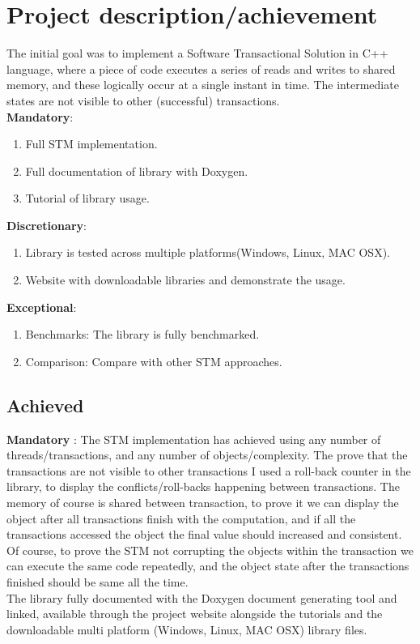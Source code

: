 \documentclass[12pt]{article}
\begin{document}
\section{Project description/achievement}
The initial goal was to implement a Software Transactional Solution in C++ language, where a piece of code executes a series of reads and writes to shared memory, and these logically occur at a single instant in time. The intermediate states are not visible to other (successful) transactions.\\
\textbf{Mandatory}:
\begin{enumerate}
\item Full STM implementation. 
\item Full documentation of library with Doxygen.
\item Tutorial of library usage.
\end{enumerate}
\textbf{Discretionary}:
\begin{enumerate}
\item Library is tested across multiple platforms(Windows, Linux, MAC OSX). 
\item Website with downloadable libraries and demonstrate the usage.
\end{enumerate}
\textbf{Exceptional}:
\begin{enumerate}
\item Benchmarks: The library is fully benchmarked. 
\item Comparison: Compare with other STM approaches.
\end{enumerate}
\subsection{Achieved}
\textbf{Mandatory} : The STM implementation has achieved using any number of threads/transactions, and any number of objects/complexity. The prove that the transactions are not visible to other transactions I used a roll-back counter in the library, to display the conflicts/roll-backs happening between transactions. The memory of course is shared between transaction, to prove it we can display the object after all transactions finish with the computation, and if all the transactions accessed the object the final value should increased and consistent. Of course, to prove the STM not corrupting the objects within the transaction we can execute the same code repeatedly, and the object state after the transactions finished should be same  all the time.\\
The library fully documented with the Doxygen document generating tool and linked, available through the project website alongside the tutorials and the downloadable multi platform (Windows, Linux, MAC OSX) library files.
\end{document}
